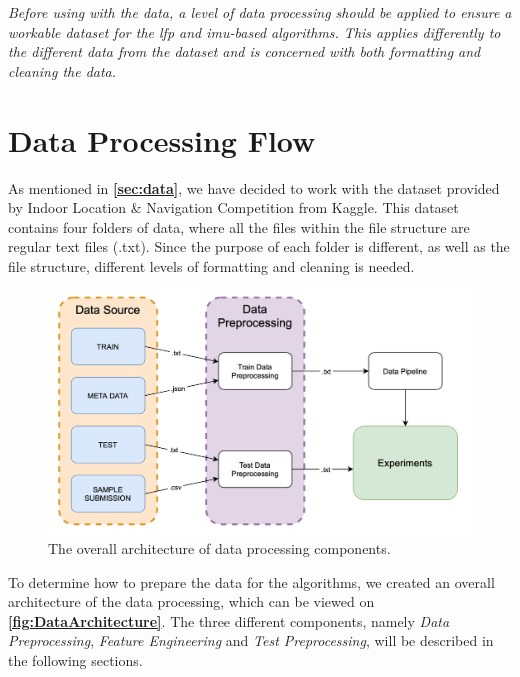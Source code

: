 \textit{Before using with the data, a level of data processing should be applied to ensure a workable dataset for the \gls{lfp} and \gls{imu}-based algorithms. This applies differently to the different data from the dataset and is concerned with both formatting and cleaning the data.}

\section{Data Processing Flow}
As mentioned in \textbf{\autoref{sec:data}}, we have decided to work with the dataset provided by Indoor Location \& Navigation Competition from Kaggle. This dataset contains four folders of data, where all the files within the file structure are regular text files (.txt). Since the purpose of each folder is different, as well as the file structure, different levels of formatting and cleaning is needed.

\begin{figure}[H]
    \centering
    \includegraphics[scale=0.38]{Images/DataStandard/DataArch.png}
    \caption{The overall architecture of data processing components.}
    \label{fig:DataArchitecture}
\end{figure}

To determine how to prepare the data for the algorithms, we created an overall architecture of the data processing, which can be viewed on \textbf{\autoref{fig:DataArchitecture}}. The three different components, namely \textit{Data Preprocessing}, \textit{Feature Engineering} and \textit{Test Preprocessing}, will be described in the following sections.


